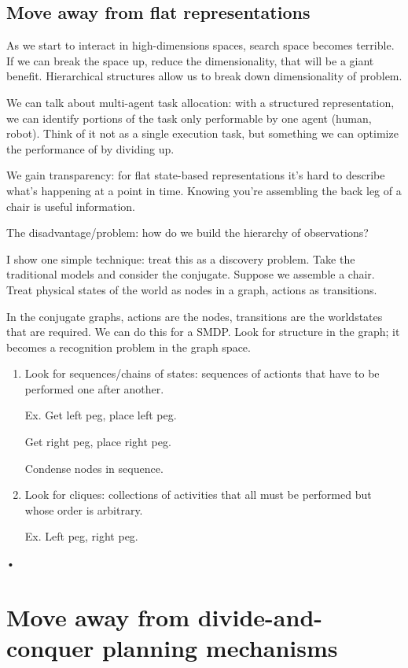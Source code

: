 \subsection{Move away from flat representations}

As we start to interact in high-dimensions spaces, search space becomes terrible. If we can break the space up, reduce the dimensionality, that will be a giant benefit. Hierarchical structures allow us to break down dimensionality of problem. %

We can talk about multi-agent task allocation: with a structured representation, we can identify portions of the task only performable by one agent (human, robot).  Think of it not as a single execution task, but something we can optimize the performance of by dividing up.

We gain transparency: for flat state-based representations it's hard to describe what's happening at a point in time. Knowing you're assembling the back leg of a chair is useful information. 

The disadvantage/problem: how do we build the hierarchy of observations?

I show one simple technique: treat this as a discovery problem. Take the traditional models and consider the conjugate. Suppose we assemble a chair. Treat physical states of the world as nodes in a graph, actions as transitions.

In the conjugate graphs, actions are the nodes, transitions are the worldstates that are required.
We can do this for a SMDP. Look for structure in the graph; it becomes a recognition problem in the graph space.

\begin{enumerate}
\item
Look for sequences/chains of states: sequences of actionts that have to be performed one after another.

Ex. Get left peg, place left peg. 

Get right peg, place right peg.

Condense nodes in sequence.
\item
 Look for cliques: collections of activities that all must be performed but whose order is arbitrary.
 
Ex. Left peg, right peg.
\end{enumerate}•

\section{Move away from divide-and-conquer planning mechanisms}

